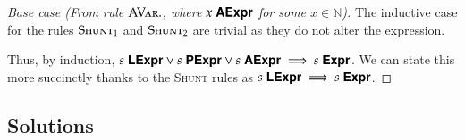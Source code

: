\documentclass{book}
\begin{document}
\begin{ExerciseList}
\begin{proof}[Base case (From rule $\textsc{AVar.}$, where ${x}\;\textsf{\textbf{AExpr}}$ for some $x \in \mathbb{N}$)]
      The inductive case for the rules $\textsc{Shunt}_1$ and $\textsc{Shunt}_2$ are trivial as they do not alter the expression.
      \bigskip
      
      Thus, by induction, ${s}\;\textsf{\textbf{LExpr}} \lor {s}\;\textsf{\textbf{PExpr}} \lor {s}\;\textsf{\textbf{AExpr}} \implies {s}\;\textsf{\textbf{Expr}}$. We can state this more succinctly thanks to the \textsc{Shunt} rules as ${s}\;\textsf{\textbf{LExpr}} \implies {s}\;\textsf{\textbf{Expr}}$.
      \end{proof}
\end{ExerciseList}
\subsection*{Solutions}
\shipoutAnswer
      
\end{document}

